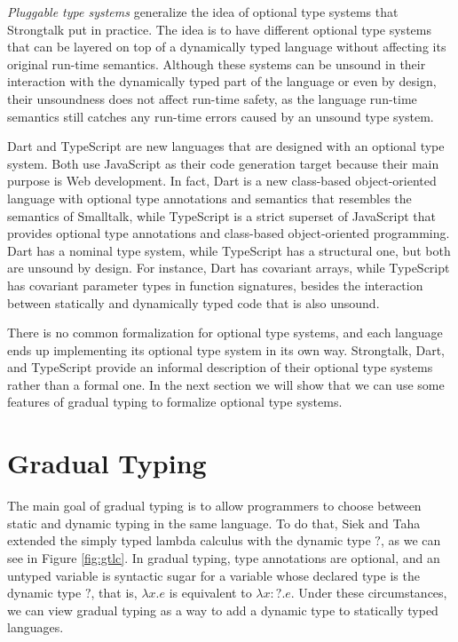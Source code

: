 \emph{Pluggable type systems} \cite{bracha2004pluggable} generalize
the idea of optional type systems that Strongtalk put in practice.
The idea is to have different optional type systems that can be layered
on top of a dynamically typed language without affecting its original
run-time semantics.
Although these systems can be unsound in their interaction with the
dynamically typed part of the language or even by design, their
unsoundness does not affect run-time safety, as the language run-time
semantics still catches any run-time errors caused by an unsound
type system.

Dart \cite{dart} and TypeScript \cite{typescript} are new
languages that are designed with an optional type system.
Both use JavaScript as their code generation target because
their main purpose is Web development.
In fact, Dart is a new class-based object-oriented language with
optional type annotations and semantics that resembles the
semantics of Smalltalk, while TypeScript is a strict superset of
JavaScript that provides optional type annotations and class-based
object-oriented programming.
Dart has a nominal type system, while TypeScript has a structural
one, but both are unsound by design.
For instance, Dart has covariant arrays, while TypeScript has
covariant parameter types in function signatures,
besides the interaction between statically and dynamically
typed code that is also unsound.

There is no common formalization for optional type systems, and
each language ends up implementing its optional type system in
its own way.
Strongtalk, Dart, and TypeScript provide an informal description of
their optional type systems rather than a formal one.
In the next section we will show that we can use some features
of gradual typing \cite{siek2006gradual,siek2007objects} to
formalize optional type systems.

\section{Gradual Typing}
\label{sec:gradual}

The main goal of gradual typing \cite{siek2006gradual} is to allow
programmers to choose between static and dynamic typing in the same
language.
To do that, Siek and Taha \cite{siek2006gradual} extended the simply
typed lambda calculus with the dynamic type $?$, as we can see in
Figure \ref{fig:gtlc}.
In gradual typing, type annotations are optional, and an untyped
variable is syntactic sugar for a variable whose declared type is
the dynamic type $?$, that is, $\lambda x.e$ is equivalent to $\lambda x{:}?.e$.
Under these circumstances, we can view gradual typing as a way to add
a dynamic type to statically typed languages.

